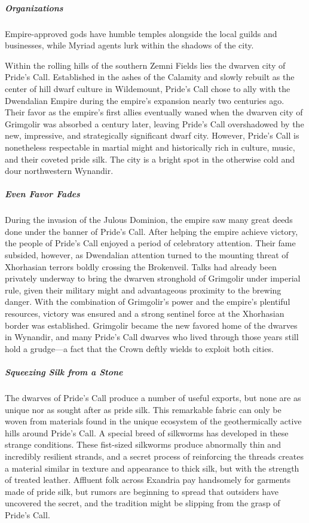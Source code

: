 \documentclass[10pt,a4paper,twoside,bg=print,twocolumn,openany,nodeprecatedcode]{dndbook}
\begin{document}
\subparagraph{Organizations}
Empire-approved gods have humble temples alongside the local guilds and businesses, while Myriad agents lurk within the shadows of the city.

Within the rolling hills of the southern Zemni Fields lies the dwarven city of Pride's Call. Established in the ashes of the Calamity and slowly rebuilt as the center of hill dwarf culture in Wildemount, Pride's Call chose to ally with the Dwendalian Empire during the empire's expansion nearly two centuries ago. Their favor as the empire's first allies eventually waned when the dwarven city of Grimgolir was absorbed a century later, leaving Pride's Call overshadowed by the new, impressive, and strategically significant dwarf city. However, Pride's Call is nonetheless respectable in martial might and historically rich in culture, music, and their coveted pride silk. The city is a bright spot in the otherwise cold and dour northwestern Wynandir.

\subparagraph{Even Favor Fades}
During the invasion of the Julous Dominion, the empire saw many great deeds done under the banner of Pride's Call. After helping the empire achieve victory, the people of Pride's Call enjoyed a period of celebratory attention. Their fame subsided, however, as Dwendalian attention turned to the mounting threat of Xhorhasian terrors boldly crossing the Brokenveil. Talks had already been privately underway to bring the dwarven stronghold of Grimgolir under imperial rule, given their military might and advantageous proximity to the brewing danger. With the combination of Grimgolir's power and the empire's plentiful resources, victory was ensured and a strong sentinel force at the Xhorhasian border was established. Grimgolir became the new favored home of the dwarves in Wynandir, and many Pride's Call dwarves who lived through those years still hold a grudge—a fact that the Crown deftly wields to exploit both cities.

\subparagraph{Squeezing Silk from a Stone}
The dwarves of Pride's Call produce a number of useful exports, but none are as unique nor as sought after as pride silk. This remarkable fabric can only be woven from materials found in the unique ecosystem of the geothermically active hills around Pride's Call. A special breed of silkworms has developed in these strange conditions. These fist-sized silkworms produce abnormally thin and incredibly resilient strands, and a secret process of reinforcing the threads creates a material similar in texture and appearance to thick silk, but with the strength of treated leather. Affluent folk across Exandria pay handsomely for garments made of pride silk, but rumors are beginning to spread that outsiders have uncovered the secret, and the tradition might be slipping from the grasp of Pride's Call.
\end{document}
